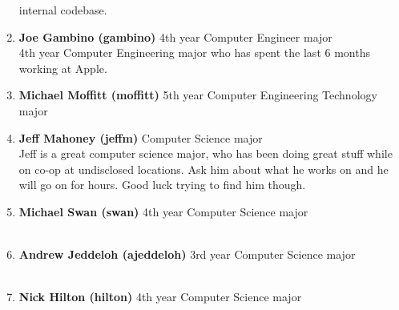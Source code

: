 \documentclass[9pt]{extarticle}
\begin{document}
\begin{enumerate}
	internal codebase.
\\
\item \textbf{Joe Gambino (gambino)} 4th year Computer Engineer major \\
	4th year Computer Engineering major who	has spent the last 6 months 
	working at Apple. 
\\
\item \textbf{Michael Moffitt (moffitt)} 5th year Computer Engineering Technology major \\
\item \textbf{Jeff Mahoney (jeffm)} Computer Science major \\
	Jeff is a great computer science major, who has been doing great stuff
	while on co-op at undisclosed locations. Ask him about what he works on
	and he will go on for hours. Good luck trying to find him though.
\\
\item \textbf{Michael Swan (swan)} 4th year Computer Science major \\
\\
\item \textbf{Andrew Jeddeloh (ajeddeloh)} 3rd year Computer Science major \\
\\
\item \textbf{Nick Hilton (hilton)} 4th year Computer Science major \\
\\

\end{enumerate}
\end{document}
